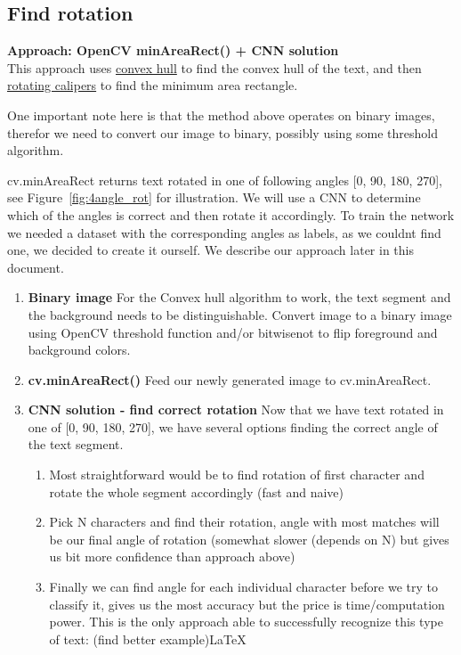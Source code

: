 \documentclass[Report.tex]{subfiles}
\begin{document}
\subsection{Find rotation}
\begin{flushleft}
  \textbf{Approach: OpenCV minAreaRect() + CNN solution} \\
  This approach uses \href{https://en.wikipedia.org/wiki/Convex_hull}{convex hull}
  to find the convex hull of the text, and then
  \href{https://en.wikipedia.org/wiki/Rotating_calipers}{rotating calipers} to
  find the minimum area rectangle. \par
  One important note here is that the method above operates on binary images, therefor we need to convert our image to binary, possibly using some threshold algorithm. \par
  cv.minAreaRect returns text rotated in one of following angles [0\textdegree, 90\textdegree, 180\textdegree, 270\textdegree], see Figure~\ref{fig:4angle_rot} for illustration. We will use a CNN to determine which of the angles is correct and then rotate it accordingly.
  To train the network we needed a dataset with the corresponding angles as labels, as we couldnt find one, we decided to create it ourself. We describe our approach later in this document.

  \begin{enumerate}
    \item \textbf{Binary image}
    For the Convex hull algorithm to work, the text segment and the background needs to be distinguishable. Convert image to a binary image using OpenCV threshold function and/or bitwise\textunderscore not to flip foreground and background colors.
    \item \textbf{cv.minAreaRect()}
    Feed our newly generated image to cv.minAreaRect.
    \item \textbf{CNN solution - find correct rotation}
    Now that we have text rotated in one of [0\textdegree, 90\textdegree, 180\textdegree, 270\textdegree], we have several options finding the correct angle of the text segment.
    \begin{enumerate}
	\item{Most straightforward would be to find rotation of first character and rotate the whole segment accordingly (fast and naive)}
	\item{Pick N characters and find their rotation, angle with most matches will be our final angle of rotation (somewhat slower (depends on N) but gives us bit more confidence than approach above)}
	\item{Finally we can find angle for each individual character before we try to classify it, gives us the most accuracy but the price is time/computation power. This is the only approach able to successfully recognize this type of text: (find better example)\LaTeX}
	\end{enumerate}
    \end{enumerate}
\end{flushleft}
\end{document}
